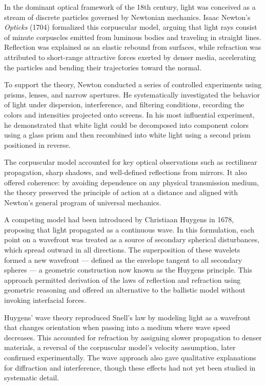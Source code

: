In the dominant optical framework of the 18th century, light was conceived as a stream of discrete particles governed by Newtonian mechanics. Isaac Newton's \textit{Opticks} (1704) formalized this corpuscular model, arguing that light rays consist of minute corpuscles emitted from luminous bodies and traveling in straight lines. Reflection was explained as an elastic rebound from surfaces, while refraction was attributed to short-range attractive forces exerted by denser media, accelerating the particles and bending their trajectories toward the normal.

To support the theory, Newton conducted a series of controlled experiments using prisms, lenses, and narrow apertures. He systematically investigated the behavior of light under dispersion, interference, and filtering conditions, recording the colors and intensities projected onto screens. In his most influential experiment, he demonstrated that white light could be decomposed into component colors using a glass prism and then recombined into white light using a second prism positioned in reverse.

The corpuscular model accounted for key optical observations such as rectilinear propagation, sharp shadows, and well-defined reflections from mirrors. It also offered coherence: by avoiding dependence on any physical transmission medium, the theory preserved the principle of action at a distance and aligned with Newton's general program of universal mechanics.

A competing model had been introduced by Christiaan Huygens in 1678, proposing that light propagated as a continuous wave. In this formulation, each point on a wavefront was treated as a source of secondary spherical disturbances, which spread outward in all directions. The superposition of these wavelets formed a new wavefront — defined as the envelope tangent to all secondary spheres — a geometric construction now known as the Huygens principle. This approach permitted derivation of the laws of reflection and refraction using geometric reasoning and offered an alternative to the ballistic model without invoking interfacial forces.

Huygens' wave theory reproduced Snell's law by modeling light as a wavefront that changes orientation when passing into a medium where wave speed decreases. This accounted for refraction by assigning slower propagation to denser materials, a reversal of the corpuscular model's velocity assumption, later confirmed experimentally. The wave approach also gave qualitative explanations for diffraction and interference, though these effects had not yet been studied in systematic detail.


